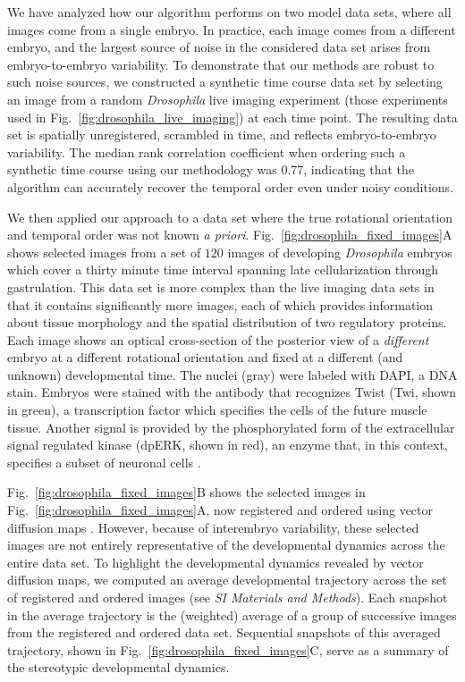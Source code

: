 \documentclass[twocolumn, 10pt]{article}
\newcommand{\SI}[0]{\textit{SI Materials and Methods}}
\newcommand{\fig}[0]{Fig.}
\begin{document}
We have analyzed how our algorithm performs on two model data sets, where all images come from a single embryo. 
%
In practice, each image comes from a different embryo, and the largest source of noise in the considered data set arises from embryo-to-embryo variability.
%
To demonstrate that our methods are robust to such noise sources,
we constructed a synthetic time course data set by selecting an image from a random {\em Drosophila} live imaging experiment (those experiments used in \fig~\ref{fig:drosophila_live_imaging}) at each time point.
%
The resulting data set is spatially unregistered, scrambled in time, and reflects embryo-to-embryo variability. 
%
The median rank correlation coefficient when ordering such a synthetic time course using our methodology was 0.77, indicating that the algorithm can accurately recover the temporal order even under noisy conditions. 

We then applied our approach to a data set where the true rotational orientation and temporal order was not known {\it a priori}.
%
\fig~\ref{fig:drosophila_fixed_images}A shows selected images from a set of $120$ images of developing {\em Drosophila} embryos which cover a thirty minute time interval spanning late cellularization through gastrulation.
%
This data set is more complex than the live imaging data sets in that it contains significantly more images, each of which provides information about tissue morphology and the spatial distribution of two regulatory proteins.
%
Each image shows an optical cross-section of the posterior view of a {\em different} embryo at a different rotational orientation and fixed at a different (and unknown) developmental time.
%
The nuclei (gray) were labeled with DAPI, a DNA stain.
%
Embryos were stained with the antibody that recognizes Twist (Twi, shown in green), a transcription factor which specifies the cells of the future muscle tissue.
%
Another signal is provided by the phosphorylated form of the extracellular signal regulated kinase (dpERK, shown in red), an enzyme that, in this context, specifies a subset of neuronal cells \citep{Lim2013kinetics}.

\fig~\ref{fig:drosophila_fixed_images}B shows the selected images in \fig~\ref{fig:drosophila_fixed_images}A, now registered and ordered using vector diffusion maps \citep{singer2012vector}.
%
However, because of interembryo variability, these selected images are not entirely representative of the developmental dynamics across the entire data set.
%
To highlight the developmental dynamics revealed by vector diffusion maps, we computed an average developmental trajectory across the set of registered and ordered images (see \SI). 
%
Each snapshot in the average trajectory is the (weighted) average of a group of successive images from the registered and ordered data set.
%
Sequential snapshots of this averaged trajectory, shown in \fig~\ref{fig:drosophila_fixed_images}C, serve as a summary of the stereotypic developmental dynamics.
\end{document}
